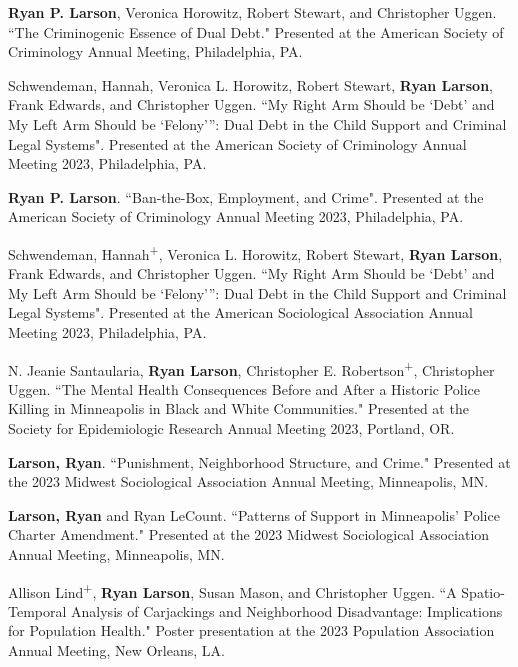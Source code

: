 \documentclass[letterpaper]{article}
\newenvironment{publist}{%
  \begin{list}{}{%
    \setlength{\leftmargin}{0cm}   %
    \setlength{\labelwidth}{2cm}     %
    \setlength{\labelsep}{0.5cm}     %
  }%
}{%
  \end{list}%
}
\begin{document}
\begin{publist}
\item \textbf{Ryan P. Larson}, Veronica Horowitz, Robert Stewart, and Christopher Uggen. ``The Criminogenic Essence of Dual Debt." Presented at the American Society of Criminology Annual Meeting, Philadelphia, PA. 

\item Schwendeman, Hannah, Veronica L. Horowitz, Robert Stewart, \textbf{Ryan Larson}, Frank Edwards, and Christopher Uggen. ``My Right Arm Should be ‘Debt’ and My Left Arm Should be ‘Felony’”:
Dual Debt in the Child Support and Criminal Legal Systems". Presented at the American Society of Criminology Annual Meeting 2023, Philadelphia, PA. 

\item \textbf{Ryan P. Larson}. ``Ban-the-Box, Employment, and Crime". Presented at the American Society of Criminology Annual Meeting 2023, Philadelphia, PA. 

\item Schwendeman, Hannah\textsuperscript{+}, Veronica L. Horowitz, Robert Stewart, \textbf{Ryan Larson}, Frank Edwards, and Christopher Uggen. ``My Right Arm Should be ‘Debt’ and My Left Arm Should be ‘Felony’”:
Dual Debt in the Child Support and Criminal Legal Systems". Presented at the American Sociological Association Annual Meeting 2023, Philadelphia, PA. 

\item N. Jeanie Santaularia, \textbf{Ryan Larson}, Christopher E. Robertson\textsuperscript{+}, Christopher Uggen. ``The Mental Health Consequences Before and After a Historic Police Killing in Minneapolis in Black and White Communities." Presented at the Society for Epidemiologic Research Annual Meeting 2023, Portland, OR.

\item \textbf{Larson, Ryan}. ``Punishment, Neighborhood Structure, and Crime." Presented at the 2023 Midwest Sociological Association Annual Meeting, Minneapolis, MN. 

\item \textbf{Larson, Ryan} and Ryan LeCount. ``Patterns of Support in Minneapolis’ Police Charter Amendment." Presented at the 2023 Midwest Sociological Association Annual Meeting, Minneapolis, MN. 

\item Allison Lind\textsuperscript{+}, \textbf{Ryan Larson}, Susan Mason, and Christopher Uggen. ``A Spatio-Temporal Analysis of Carjackings and Neighborhood Disadvantage: Implications for Population Health." Poster presentation at the 2023 Population Association Annual Meeting, New Orleans, LA. 


\end{publist}
\end{document}
